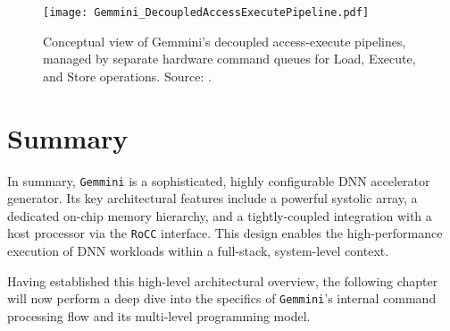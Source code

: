 \begin{figure}[htbp]
    \centering
    \texttt{[image: Gemmini\_DecoupledAccessExecutePipeline.pdf]}
    \caption{Conceptual view of Gemmini's decoupled access-execute pipelines, managed by separate hardware command queues for Load, Execute, and Store operations. Source: \cite{gemini-dac}.}
    \label{fig:decoupled_pipelines}
\end{figure}

\section{Summary}
\label{sec:gemmini_overview_summary}
In summary, \texttt{Gemmini} is a sophisticated, highly configurable DNN accelerator generator. Its key architectural features include a powerful systolic array, a dedicated on-chip memory hierarchy, and a tightly-coupled integration with a host processor via the \texttt{RoCC} interface. This design enables the high-performance execution of DNN workloads within a full-stack, system-level context. 

Having established this high-level architectural overview, the following chapter will now perform a deep dive into the specifics of \texttt{Gemmini}'s internal command processing flow and its multi-level programming model.